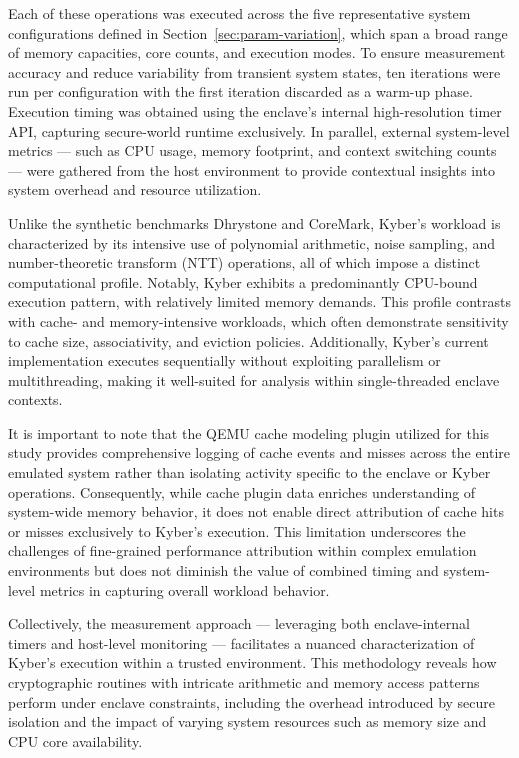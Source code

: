 Each of these operations was executed across the five representative system configurations defined in Section~\ref{sec:param-variation}, which span a broad range of memory capacities, core counts, and execution modes. To ensure measurement accuracy and reduce variability from transient system states, ten iterations were run per configuration with the first iteration discarded as a warm-up phase. Execution timing was obtained using the enclave’s internal high-resolution timer API, capturing secure-world runtime exclusively. In parallel, external system-level metrics — such as CPU usage, memory footprint, and context switching counts — were gathered from the host environment to provide contextual insights into system overhead and resource utilization.

Unlike the synthetic benchmarks Dhrystone and CoreMark, Kyber’s workload is characterized by its intensive use of polynomial arithmetic, noise sampling, and number-theoretic transform (NTT) operations, all of which impose a distinct computational profile. Notably, Kyber exhibits a predominantly CPU-bound execution pattern, with relatively limited memory demands. This profile contrasts with cache- and memory-intensive workloads, which often demonstrate sensitivity to cache size, associativity, and eviction policies. Additionally, Kyber’s current implementation executes sequentially without exploiting parallelism or multithreading, making it well-suited for analysis within single-threaded enclave contexts.

It is important to note that the QEMU cache modeling plugin \cite{mandour2021cache} utilized for this study provides comprehensive logging of cache events and misses across the entire emulated system rather than isolating activity specific to the enclave or Kyber operations. Consequently, while cache plugin data enriches understanding of system-wide memory behavior, it does not enable direct attribution of cache hits or misses exclusively to Kyber’s execution. This limitation underscores the challenges of fine-grained performance attribution within complex emulation environments but does not diminish the value of combined timing and system-level metrics in capturing overall workload behavior.

Collectively, the measurement approach — leveraging both enclave-internal timers and host-level monitoring — facilitates a nuanced characterization of Kyber’s execution within a trusted environment. This methodology reveals how cryptographic routines with intricate arithmetic and memory access patterns perform under enclave constraints, including the overhead introduced by secure isolation and the impact of varying system resources such as memory size and CPU core availability.

